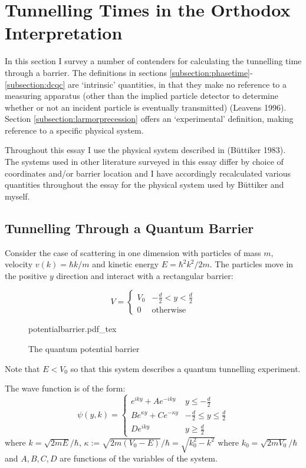 \documentclass{article}
\newcommand{\incfig}[1]{%
    \def\svgwidth{10cm}
    {#1.pdf_tex}
}
\begin{document}
\section{Tunnelling Times in the Orthodox Interpretation}
\label{section:Orthodox}

In this section I survey a number of contenders for calculating the tunnelling time through a barrier. The definitions in sections \ref{subsection:phasetime}-\ref{subsection:dcqc} are `intrinsic' quantities, in that they make no reference to a measuring apparatus (other than the implied particle detector to determine whether or not an incident particle is eventually transmitted) (Leavens 1996). Section \ref{subsection:larmorprecession} offers an `experimental' definition, making reference to a specific physical system.

Throughout this essay I use the physical system described in (B{\"u}ttiker 1983). The systems used in other literature surveyed in this essay differ by choice of coordinates and/or barrier location and I have accordingly recalculated various quantities throughout the essay for the physical system used by B{\"u}ttiker and myself.

\subsection{Tunnelling Through a Quantum Barrier}
\label{subsection:quantumbarrier}

\noindent Consider the case of scattering in one dimension with particles of mass $m$, velocity $v(k) = \hbar k/m$ and kinetic energy $E = \hbar^2k^2/2m$. The particles move in the positive $y$ direction and interact with a rectangular barrier:

\begin{equation}
	V = 
	\begin{cases}
	V_0 & -\frac{d}{2}<y<\frac{d}{2}\\
		0 & \text{otherwise}
	\end{cases}
\end{equation}

\begin{figure}[ht]
    \centering
    \incfig{potentialbarrier}
    \caption{The quantum potential barrier}
    \label{fig:potentialbarrier}
\end{figure}

\noindent Note that $E<V_0$ so that this system describes a quantum tunnelling experiment.

\noindent The wave function is of the form:
\begin{equation}
	\psi(y,k) = 
	\begin{cases}
		e^{iky} + Ae^{-iky} & y \leq -\frac{d}{2} \\
		Be^{\kappa y} + Ce^{-\kappa y} & -\frac{d}{2} \leq y \leq \frac{d}{2} \\
		De^{iky} & y \geq \frac{d}{2}
	\end{cases}
	\label{wavefunction}
\end{equation}
\noindent where $k = \sqrt{2mE}/\hbar$, $\kappa := \sqrt{2m(V_0-E)}/\hbar = \sqrt{k_0^2-k^2} \text{ where } k_0 = \sqrt{2mV_0}/\hbar$ and $A,B,C,D$ are functions of the variables of the system.
\end{document}
